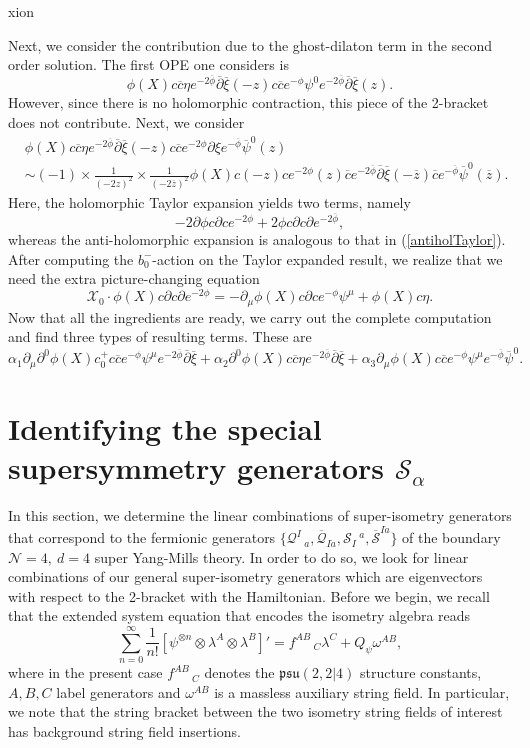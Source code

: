 xion\documentclass[12pt]{article}
\def\be{\begin{equation}}
\def\ee{\end{equation}}
\def\ie{\begin{equation}\begin{aligned}}
\def\fe{\end{aligned}\end{equation}}
\numberwithin{equation}{section}
\newcommand{\B}[1]{\overline{#1}}
\begin{document}
Next, we consider the contribution due to the ghost-dilaton term in the second order solution. The first OPE one considers is
\be
    \phi(X)c\B{c}\eta e^{-2\B{\phi}}\B{\partial}\B{\xi}(-z)c\B{c}e^{-\phi}\psi^{0}e^{-2\B{\phi}}\B{\partial}\B{\xi}(z).
\ee
However, since there is no holomorphic contraction, this piece of the 2-bracket does not contribute. Next, we consider
\ie
    &\phi(X)c\B{c}\eta e^{-2\B{\phi}}\B{\partial}\B{\xi}(-z)c\B{c}e^{-2\phi}\partial\xi e^{-\B{\phi}}\B{\psi}^0(z)\\
    &\sim(-1)\times\frac{1}{(-2z)^2}\times\frac{1}{(-2\B{z})^2}\phi(X)c(-z)ce^{-2\phi}(z)\B{c}e^{-2\B{\phi}}\B{\partial}\B{\xi}(-\B{z})\B{c}e^{-\B{\phi}}\B{\psi}^0(\B{z}).
\fe
Here, the holomorphic Taylor expansion yields two terms, namely
\be
    -2\partial\phi c\partial ce^{-2\phi}+2\phi c\partial c\partial e^{-2\B{\phi}},
\ee
whereas the anti-holomorphic expansion is analogous to that in (\ref{antiholTaylor}). After computing the $b_0^-$-action on the Taylor expanded result, we realize that we need the extra picture-changing equation
\be
    \mathcal{X}_0\cdot\phi(X)c\partial c\partial e^{-2\phi}=-\partial_{\mu}\phi(X)c\partial ce^{-\phi}\psi^{\mu}+\phi(X)c\eta.
\ee
Now that all the ingredients are ready, we carry out the complete computation and find three types of resulting terms. These are
\be
    \alpha_1\partial_{\mu}\partial^0\phi(X)c_0^+c\B{c}e^{-\phi}\psi^{\mu}e^{-2\B{\phi}}\B{\partial}\B{\xi}+\alpha_2\partial^0\phi(X)c\B{c}\eta e^{-2\B{\phi}}\B{\partial}\B{\xi}+\alpha_3\partial_{\mu}\phi(X)c\B{c}e^{-\phi}\psi^{\mu}e^{-\B{\phi}}\B{\psi}^0.
\ee


\section{Identifying the special supersymmetry generators $\mathcal{S}_\alpha$}
In this section, we determine the linear combinations of super-isometry generators that correspond to the fermionic generators $\{\mathcal{Q}^I\,_{a},\B{\mathcal{Q}}_{I\dot{a}},\mathcal{S}_I\,^{a},\B{\mathcal{S}}^{I\dot{a}}\}$ of the boundary $\mathcal{N}=4,\ d=4$ super Yang-Mills theory. In order to do so, we look for linear combinations of our general super-isometry generators which are eigenvectors with respect to the 2-bracket with the Hamiltonian. Before we begin, we recall that the extended system equation that encodes the isometry algebra reads
\be \label{algebra}
	\sum_{n=0}^{\infty}\frac{1}{n!}[\psi^{\otimes n}\otimes\lambda^{A}\otimes\lambda^{B}]'=f^{AB}\,_{C}\lambda^{C}+Q_{\psi}\omega^{AB},
\ee
where in the present case $f^{AB}\,_{C}$ denotes the $\mathfrak
{psu}(2,2|4)$ structure constants, $A,B,C$ label generators and $\omega^{AB}$ is a massless auxiliary string field. In particular, we note that the string bracket between the two isometry string fields of interest has background string field insertions.
\end{document}
